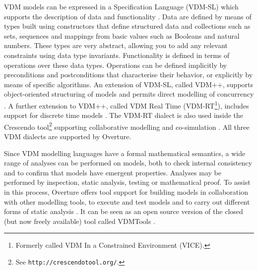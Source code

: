 \documentclass{overturerepchap}
\newcommand{\url}[1]{\texttt{#1}}
\begin{document}
VDM models can be expressed in a Specification Language (VDM-SL) which
supports the description of data and functionality
\cite{ISOVDM96a,Fitzgerald&98b,Fitzgerald&09}. Data are defined by
means of types built using constructors that define structured data
and collections such as sets, sequences and mappings from basic values
such as Booleans and natural numbers. These types are very abstract,
allowing you to add any relevant constraints using data type
invariants. Functionality is defined in terms of operations over these
data types. Operations can be defined implicitly by preconditions and
postconditions that characterise their behavior, or explicitly by
means of specific algorithms. An extension of VDM-SL, called VDM++,
supports object-oriented structuring of models and permits direct
modelling of concurrency \cite{Fitzgerald&05}. A further extension
to VDM++, called VDM Real Time (VDM-RT\footnote{Formerly called VDM In a
Constrained Environment (VICE).}), includes support for discrete
time models \cite{Mukherjee&00,Verhoef&06b}. The VDM-RT dialect is also used inside 
the Crescendo tool\footnote{See \url{http://crescendotool.org/}.} supporting collaborative modelling and co-simulation \cite{Fitzgerald&14c}. All
three VDM dialects are supported by Overture.

Since VDM modelling languages have a formal mathematical semantics,
a wide range of ana\-ly\-ses can be performed on models, both to check
internal consistency and to confirm that models have emergent
properties. Analyses may be performed by inspection, static analysis,
testing or mathematical proof. To assist in this process, Overture
offers tool support for building models in collaboration with other
modelling tools, to execute and test models and to carry out different
forms of static analysis \cite{Larsen&13b}. It can be seen as an open
source version of the closed (but now freely available) tool called VDMTools
\cite{Elmstrom&94,Larsen01,Fitzgerald&08a}.
\end{document}
